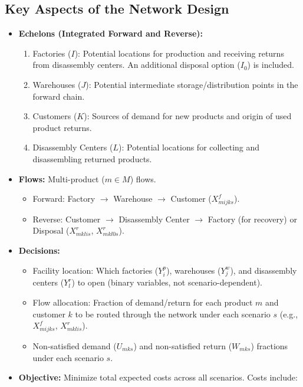 \subsection*{Key Aspects of the Network Design}
\begin{itemize}
    \item \textbf{Echelons (Integrated Forward and Reverse):}
        \begin{enumerate}
            \item Factories ($I$): Potential locations for production and receiving returns from disassembly centers. An additional disposal option ($I_0$) is included.
            \item Warehouses ($J$): Potential intermediate storage/distribution points in the forward chain.
            \item Customers ($K$): Sources of demand for new products and origin of used product returns.
            \item Disassembly Centers ($L$): Potential locations for collecting and disassembling returned products.
        \end{enumerate}
    \item \textbf{Flows:} Multi-product ($m \in M$) flows.
        \begin{itemize}
            \item Forward: Factory $\rightarrow$ Warehouse $\rightarrow$ Customer ($X^f_{mijks}$).
            \item Reverse: Customer $\rightarrow$ Disassembly Center $\rightarrow$ Factory (for recovery) or Disposal ($X^r_{mklis}$, $X^r_{mkl0s}$).
        \end{itemize}
    \item \textbf{Decisions:}
        \begin{itemize}
            \item Facility location: Which factories ($Y^p_i$), warehouses ($Y^w_j$), and disassembly centers ($Y^r_l$) to open (binary variables, not scenario-dependent).
            \item Flow allocation: Fraction of demand/return for each product $m$ and customer $k$ to be routed through the network under each scenario $s$ (e.g., $X^f_{mijks}$, $X^r_{mklis}$).
            \item Non-satisfied demand ($U_{mks}$) and non-satisfied return ($W_{mks}$) fractions under each scenario $s$.
        \end{itemize}
    \item \textbf{Objective:} Minimize total expected costs across all scenarios. Costs include:

\end{itemize}
